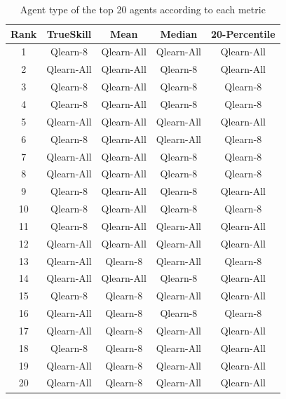 \begin{table}[H]
\centering
\begin{tabular}{|| c | c | c | c | c ||} 
 \hline
 Rank & TrueSkill & Mean & Median & 20-Percentile \\ [0.5ex] 
 \hline\hline
   1 &    Qlearn-8 &  Qlearn-All &  Qlearn-All &    Qlearn-All \\
   2 &  Qlearn-All &  Qlearn-All &    Qlearn-8 &    Qlearn-All \\
   3 &    Qlearn-8 &  Qlearn-All &    Qlearn-8 &      Qlearn-8 \\
   4 &    Qlearn-8 &  Qlearn-All &    Qlearn-8 &      Qlearn-8 \\
   5 &  Qlearn-All &  Qlearn-All &  Qlearn-All &    Qlearn-All \\
   6 &    Qlearn-8 &  Qlearn-All &  Qlearn-All &      Qlearn-8 \\
   7 &  Qlearn-All &  Qlearn-All &    Qlearn-8 &      Qlearn-8 \\
   8 &  Qlearn-All &  Qlearn-All &    Qlearn-8 &      Qlearn-8 \\
   9 &    Qlearn-8 &  Qlearn-All &    Qlearn-8 &    Qlearn-All \\
  10 &    Qlearn-8 &  Qlearn-All &    Qlearn-8 &      Qlearn-8 \\
  11 &    Qlearn-8 &  Qlearn-All &  Qlearn-All &    Qlearn-All \\
  12 &  Qlearn-All &  Qlearn-All &  Qlearn-All &    Qlearn-All \\
  13 &  Qlearn-All &    Qlearn-8 &  Qlearn-All &      Qlearn-8 \\
  14 &  Qlearn-All &  Qlearn-All &    Qlearn-8 &    Qlearn-All \\
  15 &    Qlearn-8 &    Qlearn-8 &  Qlearn-All &    Qlearn-All \\
  16 &  Qlearn-All &    Qlearn-8 &    Qlearn-8 &      Qlearn-8 \\
  17 &  Qlearn-All &    Qlearn-8 &  Qlearn-All &    Qlearn-All \\
  18 &    Qlearn-8 &    Qlearn-8 &  Qlearn-All &    Qlearn-All \\
  19 &  Qlearn-All &    Qlearn-8 &  Qlearn-All &    Qlearn-All \\
  20 &  Qlearn-All &    Qlearn-8 &  Qlearn-All &    Qlearn-All \\[1ex] 
 \hline
\end{tabular}
\caption{Agent type of the top 20 agents according to each metric}
\label{TypeRankings}
\end{table}

